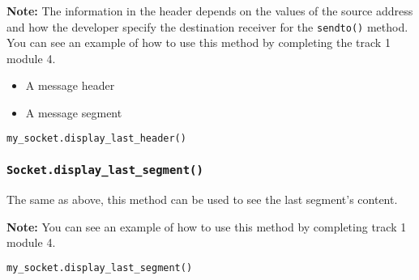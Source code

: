 \documentclass[11pt]{article}
\begin{document}
\textbf{Note:}
The information in the header depends on the values of the source address and how the developer specify the destination receiver for the \texttt{sendto()} method. You can see an example of how to use this method by completing the track 1 module 4.

\begin{itemize}
    \item A message header

    \item A message segment
\end{itemize}

\begin{lstlisting}[caption={Example for using \texttt{display\_last\_header()}}, language=Python]
my_socket.display_last_header()
\end{lstlisting}

\subsubsection{\texttt{Socket.display\_last\_segment()}}
The same as above, this method can be used to see the last segment's content.

\textbf{Note:}
You can see an example of how to use this method by completing track 1 module 4.

\begin{lstlisting}[caption={Example for using \texttt{display\_last\_segment()}}, language=Python]
my_socket.display_last_segment()
\end{lstlisting}
\end{document}
